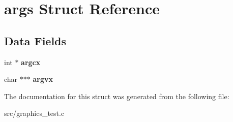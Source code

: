 \hypertarget{structargs}{}\section{args Struct Reference}
\label{structargs}
\subsection*{Data Fields}
\begin{DoxyCompactItemize}
\item 
int $\ast$ {\bfseries argcx}\hypertarget{structargs_a30c43921d0e38f664449dcddbaef67e3}{}\label{structargs_a30c43921d0e38f664449dcddbaef67e3}

\item 
char $\ast$$\ast$$\ast$ {\bfseries argvx}\hypertarget{structargs_aaf2e541d1412bc7c90cd98085e713c9c}{}\label{structargs_aaf2e541d1412bc7c90cd98085e713c9c}

\end{DoxyCompactItemize}


The documentation for this struct was generated from the following file\+:\begin{DoxyCompactItemize}
\item 
src/graphics\+\_\+test.\+c\end{DoxyCompactItemize}
